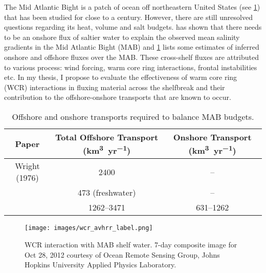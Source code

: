 The Mid Atlantic Bight is a patch of ocean off northeastern United States (see \cref{fig:avhrr}) that has been studied for close to a century. However, there are still unresolved questions regarding its heat, volume and salt budgets. \cite{Lentz2010} has shown that there needs to be an onshore flux of saltier water to explain the observed mean salinity gradients in the Mid Atlantic Bight (MAB) and \cref{tab:budget} lists some estimates of inferred onshore and offshore fluxes over the MAB. These cross-shelf fluxes are attributed to various process: wind forcing, warm core ring interactions, frontal instabilities etc.  In my thesis, I propose to evaluate the effectiveness of warm core ring (WCR) interactions in fluxing material across the shelfbreak and their contribution to the offshore-onshore transports that are known to occur.
\linespread{1}
\begin{table}[h]
	\centering
	\begin{tabular}{ccc}
		\toprule
		 Paper	&  {Total Offshore Transport (\si{\km^3\per yr})} & {Onshore Transport (\si{\km^3\per yr})}\\ \midrule
		Wright (1976) &	2400  & {--} \\  
		\cite{Loder1998} & 473 (freshwater)	& {--}	\\
		\cite{Brink1998} & \numrange{1262}{3471} & \numrange{631}{1262} \\
 		\bottomrule
	\end{tabular}
	\caption{Offshore and onshore transports required to balance MAB budgets.}
	\label{tab:budget}
\end{table}
\linespread{1.5}
\begin{figure}
    \centering
    \texttt{[image: images/wcr\_avhrr\_label.png]}
    \caption{WCR interaction with MAB shelf water. 7-day composite image for Oct 28, 2012 courtesy of Ocean Remote Sensing Group, Johns Hopkins University Applied Physics Laboratory.}
    \label{fig:avhrr}
\end{figure}


